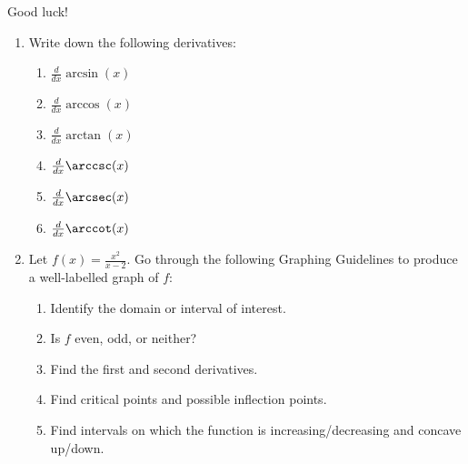 \documentclass[11pt,letterpaper]{article}
\begin{document}
\vfill
\begin{flushright}\Large Good luck!\end{flushright}

\begin{enumerate}
\newpage
\item Write down the following derivatives:
\begin{enumerate}

\vspace{1pc}
\item $\frac{d}{dx}\arcsin(x)$

\vspace{6pc}
\item $\frac{d}{dx}\arccos(x)$

\vspace{6pc}
\item $\frac{d}{dx}\arctan(x)$

\vspace{6pc}
\item $\frac{d}{dx}\arccsc(x)$

\vspace{6pc}
\item $\frac{d}{dx}\arcsec(x)$

\vspace{6pc}
\item $\frac{d}{dx}\arccot(x)$

\vspace{5pc}
\end{enumerate}

\newpage
\item Let $f(x)=\frac{x^2}{x-2}$.  Go through the following Graphing Guidelines to produce a well-labelled graph of $f$:  
\begin{enumerate}
\item Identify the domain or interval of interest.

\vspace{3pc}
\item Is $f$ even, odd, or neither?

\vspace{5pc}
\item Find the first and second derivatives.

\vspace{20pc}
\item Find critical points and possible inflection points.

\newpage
\item Find intervals on which the function is increasing/decreasing and concave up/down.


\end{enumerate}
\end{enumerate}
\end{document}
